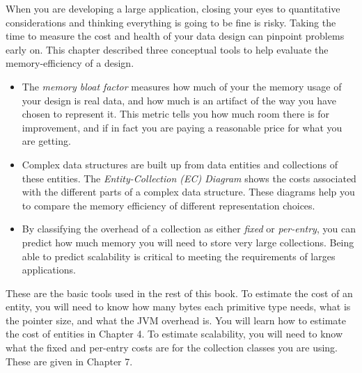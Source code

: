 When you are developing a large application, closing your eyes to quantitative considerations and thinking everything is going to be fine is risky. Taking the time to measure the cost and health of your data design can pinpoint problems early on. This chapter described three conceptual tools to help evaluate the memory-efficiency of a design.
\begin{itemize}
\item The \textsl{memory bloat factor} measures how much of your the memory usage of your design is real data, and how much is an artifact of the way you have chosen to represent it. This metric tells you how much room there is for improvement, and if in fact you are paying a reasonable price for what you are getting.
\item Complex data structures are built up from data entities and collections of these entities.  The \textsl{Entity-Collection (EC) Diagram} shows the costs associated with the different parts of a complex data structure. These diagrams help you to compare the memory efficiency of different representation choices.
\item By classifying the overhead of a collection as either \textsl{fixed} or \textsl{per-entry}, you can predict how much memory you will need to store very large collections. Being able to predict scalability is critical to meeting the requirements of larges applications. 
\end{itemize}
These are the basic tools used in the rest of this book. To estimate the cost of an entity, you will need to know how many bytes each primitive type needs, what is the pointer size, and what the JVM overhead is. You will learn how to estimate the cost of entities in Chapter 4. To estimate scalability, you will need to know what the fixed and per-entry costs are for the collection classes you are using. These are given in Chapter 7.

